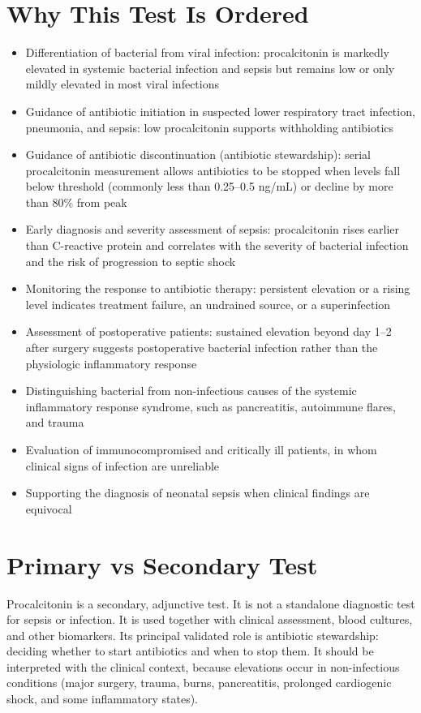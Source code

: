 \section*{Why This Test Is Ordered}
\begin{itemize}
  \item Differentiation of bacterial from viral infection: procalcitonin is markedly elevated in systemic bacterial infection and sepsis but remains low or only mildly elevated in most viral infections
  \item Guidance of antibiotic initiation in suspected lower respiratory tract infection, pneumonia, and sepsis: low procalcitonin supports withholding antibiotics
  \item Guidance of antibiotic discontinuation (antibiotic stewardship): serial procalcitonin measurement allows antibiotics to be stopped when levels fall below threshold (commonly less than 0.25--0.5 ng/mL) or decline by more than 80\% from peak
  \item Early diagnosis and severity assessment of sepsis: procalcitonin rises earlier than C-reactive protein and correlates with the severity of bacterial infection and the risk of progression to septic shock \cite{wacker2013procalcitonin}
  \item Monitoring the response to antibiotic therapy: persistent elevation or a rising level indicates treatment failure, an undrained source, or a superinfection
  \item Assessment of postoperative patients: sustained elevation beyond day 1--2 after surgery suggests postoperative bacterial infection rather than the physiologic inflammatory response
  \item Distinguishing bacterial from non-infectious causes of the systemic inflammatory response syndrome, such as pancreatitis, autoimmune flares, and trauma
  \item Evaluation of immunocompromised and critically ill patients, in whom clinical signs of infection are unreliable
  \item Supporting the diagnosis of neonatal sepsis when clinical findings are equivocal
\end{itemize}

\section*{Primary vs Secondary Test}
Procalcitonin is a secondary, adjunctive test. It is not a standalone diagnostic test for sepsis or infection. It is used together with clinical assessment, blood cultures, and other biomarkers. Its principal validated role is antibiotic stewardship: deciding whether to start antibiotics and when to stop them. It should be interpreted with the clinical context, because elevations occur in non-infectious conditions (major surgery, trauma, burns, pancreatitis, prolonged cardiogenic shock, and some inflammatory states).

